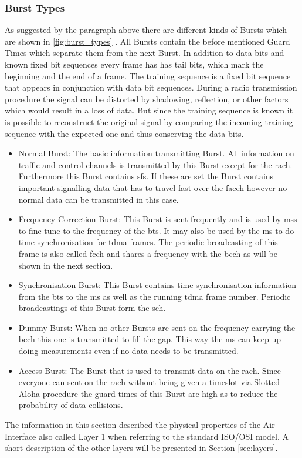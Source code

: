 \subsubsection{Burst Types}
As suggested by the paragraph above there are different kinds of Bursts which are shown in \ref{fig:burst_types} \cite{GSM2009}.
All Bursts contain the before mentioned Guard Times which separate them from the next Burst.
In addition to data bits and known fixed bit sequences every frame has has tail bits, which mark the beginning and the end of a frame.
The training sequence is a fixed bit sequence that appears in conjunction with data bit sequences.
During a radio transmission procedure the signal can be distorted by shadowing, reflection, or other factors which would result in a loss of data.
But since the training sequence is known it is possible to reconstruct the original signal by comparing the incoming training sequence with the expected one and thus conserving the data bits.
\begin{itemize}
	\item Normal Burst: The basic information transmitting Burst.
	All information on traffic and control channels is transmitted by this Burst except for the \gls{rach}.
	Furthermore this Burst contains \glspl{sf}.
	If these are set the Burst contains important signalling data that has to travel fast over the \gls{facch} however no normal data can be transmitted in this case.
	\item Frequency Correction Burst: This Burst is sent frequently and is used by \glspl{ms} to fine tune to the frequency of the \gls{bts}.
	It may also be used by the \gls{ms} to do time synchronisation for \gls{tdma} frames.
	The periodic broadcasting of this frame is also called \gls{fcch} and shares a frequency with the \gls{bcch} as will be shown in the next section.
	\item Synchronisation Burst: This Burst contains time synchronisation information from the \gls{bts} to the \gls{ms} as well as the running \gls{tdma} frame number.
	Periodic broadcastings of this Burst form the \gls{sch}.
	\item Dummy Burst: When no other Bursts are sent on the frequency carrying the \gls{bcch} this one is transmitted to fill the gap.
	This way the \gls{ms} can keep up doing measurements even if no data needs to be transmitted.
	\item Access Burst: The Burst that is used to transmit data on the \gls{rach}.
	Since everyone can sent on the \gls{rach} without being given a timeslot via Slotted Aloha procedure the guard times of this Burst are high as to reduce the probability of data collisions.
\end{itemize}
The information in this section described the physical properties of the Air Interface also called Layer 1 when referring to the standard ISO/OSI model.
A short description of the other layers will be presented in Section \ref{sec:layers}.

